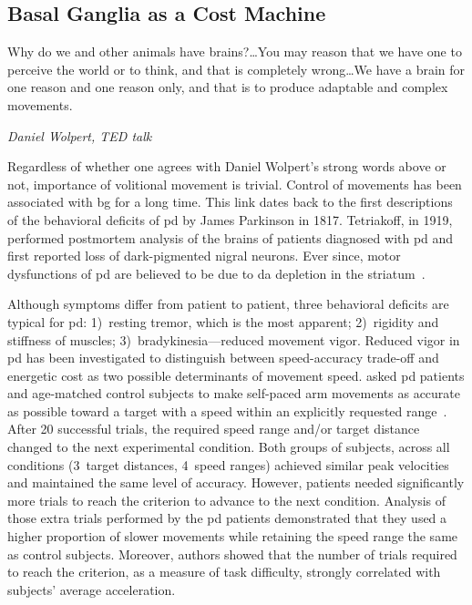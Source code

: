 \subsection{Basal Ganglia as a Cost Machine}
\label{intro:BGMotor}
\epigraph{Why do we and other animals have brains?\dots You may reason that we have one to perceive the world or to think, and that is completely wrong\dots We have a brain for one reason and one reason only, and that is to produce adaptable and complex movements.}
{\textit{Daniel Wolpert, TED talk}}
\noindent
Regardless of whether one agrees with Daniel Wolpert's strong words above or not, importance of volitional movement is trivial.
Control of movements has been associated with \gls{bg} for a long time.
This link dates back to the first descriptions of the behavioral deficits of \gls{pd} by James Parkinson in 1817.
Tetriakoff, in 1919, performed postmortem analysis of the brains of patients diagnosed with \gls{pd} and first reported loss of dark-pigmented nigral neurons.
Ever since, motor dysfunctions of \gls{pd} are believed to be due to \gls{da} depletion in the striatum~\cite{Hornykiewicz2006,McGregor2019Neuron,Redgrave2010, Panigrahi2015Cell}.
\par
Although symptoms differ from patient to patient, three behavioral deficits are typical for \gls{pd}:
    1)~resting tremor, which is the most apparent;
    2)~rigidity and stiffness of muscles;
    3)~bradykinesia---reduced movement vigor.
Reduced vigor in \gls{pd} has been investigated to distinguish between speed-accuracy trade-off and energetic cost as two possible determinants of movement speed.
 asked \gls{pd} patients and age-matched control subjects to make self-paced arm movements as accurate as possible toward a target with a speed within an explicitly requested range~\cite{Mazzoni2007}.
After 20 successful trials, the required speed range and/or target distance changed to the next experimental condition.
Both groups of subjects, across all conditions (3~target distances, 4~speed ranges) achieved similar peak velocities and maintained the same level of accuracy.
However, patients needed significantly more trials to reach the criterion to advance to the next condition.
Analysis of those extra trials performed by the \gls{pd} patients demonstrated that they used a higher proportion of slower movements while retaining the speed range the same as control subjects.
Moreover, authors showed that the number of trials required to reach the criterion, as a measure of task difficulty, strongly correlated with subjects' average acceleration.
